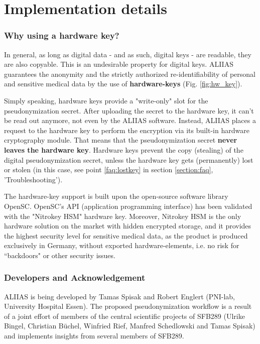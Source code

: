 
\section{Implementation details}
\label{section:implementation}
\subsubsection*{Why using a hardware key?}

In general, as long as digital data - and as such, digital keys - are readable, they are also copyable. This is an undesirable property for digital keys.
ALIIAS guarantees the anonymity and the strictly authorized re-identifiability of personal and sensitive medical data by the use of \textbf{hardware-keys} (Fig. \ref{fig:hw_key}).

Simply speaking, hardware keys provide a "write-only" slot for the pseudonymization secret. After uploading the secret to the hardware key, it can't be read out anymore, not even by the ALIIAS software. Instead, ALIIAS places a request to the hardware key to perform the encryption via its built-in hardware cryptography module. That means that the pseudonymization secret \textbf{never leaves the hardware key}. Hardware keys prevent the copy (stealing) of the digital pseudonymization secret, unless the hardware key gets (permanently) lost or stolen (in this case, see point \ref{faq:lostkey} in section \ref{section:faq}, 'Troubleshooting').

The hardware-key support is built upon the open-source software library OpenSC. OpenSC's API (application programming interface) has been validated with the "Nitrokey HSM" hardware key. Moreover, Nitrokey HSM is the only hardware solution on the market with hidden encrypted storage, and it provides the highest security level for sensitive medical data, as the product is produced exclusively in Germany, without exported hardware-elements, i.e. no risk for “backdoors" or other security issues.

\subsubsection*{Developers and Acknowledgement}

ALIIAS is being developed by Tamas Spisak and Robert Englert (PNI-lab, University Hospital Essen). The proposed pseudonymization workflow is a result of a joint effort of members of the central scientific projects of SFB289 (Ulrike Bingel, Christian Büchel, Winfried Rief, Manfred Schedlowski and Tamas Spisak) and implements insights from several members of SFB289.